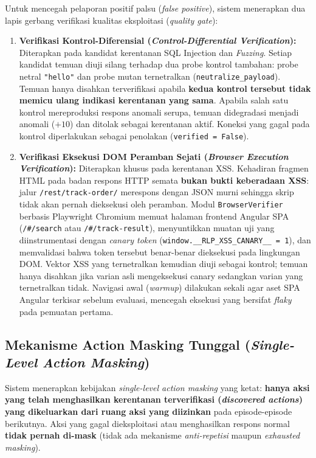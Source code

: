 \begin{enumerate}
Untuk mencegah pelaporan positif palsu (\textit{false positive}), sistem menerapkan dua lapis gerbang verifikasi kualitas eksploitasi (\textit{quality gate}):
\begin{enumerate}
    \item \textbf{Verifikasi Kontrol-Diferensial (\textit{Control-Differential Verification}):} Diterapkan pada kandidat kerentanan SQL Injection dan \textit{Fuzzing}. Setiap kandidat temuan diuji silang terhadap dua probe kontrol tambahan: probe netral \texttt{"hello"} dan probe mutan ternetralkan (\texttt{neutralize\_payload}). Temuan hanya disahkan terverifikasi apabila \textbf{kedua kontrol tersebut tidak memicu ulang indikasi kerentanan yang sama}. Apabila salah satu kontrol mereproduksi respons anomali serupa, temuan didegradasi menjadi anomali ($+10$) dan ditolak sebagai kerentanan aktif. Koneksi yang gagal pada kontrol diperlakukan sebagai penolakan (\texttt{verified = False}).
    \item \textbf{Verifikasi Eksekusi DOM Peramban Sejati (\textit{Browser Execution Verification}):} Diterapkan khusus pada kerentanan XSS. Kehadiran fragmen HTML pada badan respons HTTP semata \textbf{bukan bukti keberadaan XSS}: jalur \texttt{/rest/track-order/} merespons dengan JSON murni sehingga skrip tidak akan pernah dieksekusi oleh peramban. Modul \texttt{BrowserVerifier} berbasis Playwright Chromium memuat halaman frontend Angular SPA (\texttt{/\#/search} atau \texttt{/\#/track-result}), menyuntikkan muatan uji yang diinstrumentasi dengan \textit{canary token} (\texttt{window.\_\_RLP\_XSS\_CANARY\_\_ = 1}), dan memvalidasi bahwa token tersebut benar-benar dieksekusi pada lingkungan DOM. Vektor XSS yang ternetralkan kemudian diuji sebagai kontrol; temuan hanya disahkan jika varian asli mengeksekusi canary sedangkan varian yang ternetralkan tidak. Navigasi awal (\textit{warmup}) dilakukan sekali agar aset SPA Angular terkisar sebelum evaluasi, mencegah eksekusi yang bersifat \textit{flaky} pada pemuatan pertama.
\end{enumerate}

\subsection{Mekanisme Action Masking Tunggal (\textit{Single-Level Action Masking})}

Sistem menerapkan kebijakan \textit{single-level action masking} yang ketat: \textbf{hanya aksi yang telah menghasilkan kerentanan terverifikasi (\textit{discovered actions}) yang dikeluarkan dari ruang aksi yang diizinkan} pada episode-episode berikutnya. Aksi yang gagal dieksploitasi atau menghasilkan respons normal \textbf{tidak pernah di-mask} (tidak ada mekanisme \textit{anti-repetisi} maupun \textit{exhausted masking}).


\end{enumerate}
